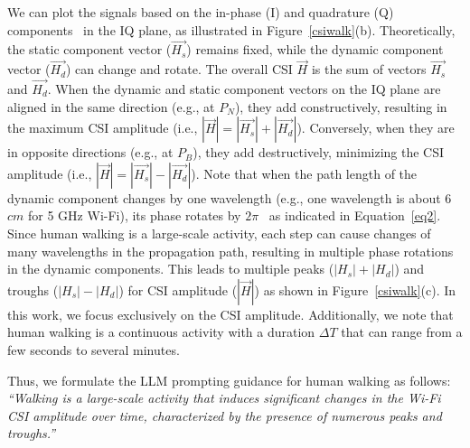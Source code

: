 


We can plot the signals based on the in-phase (I) and quadrature (Q) components~\cite{wang2015understanding} in the IQ plane, as illustrated in Figure~\ref{csiwalk}(b). Theoretically, the static component vector ($\vec{H_s}$) remains fixed, while the dynamic component vector ($\vec{H_d}$) can change and rotate. The overall CSI $\vec{H}$ is the sum of vectors $\vec{H_s}$ and $\vec{H_d}$. When the dynamic and static component vectors on the IQ plane are aligned in the same direction (e.g., at $P_{N}$), they add constructively, resulting in the maximum CSI amplitude (i.e., $|\vec{H}|=|\vec{H_s}|+|\vec{H_d}|$). Conversely, when they are in opposite directions (e.g., at $P_{B}$), they add destructively, minimizing the CSI amplitude (i.e., $|\vec{H}|=|\vec{H_s}|-|\vec{H_d}|$). Note that when the path length of the dynamic component changes by one wavelength (e.g., one wavelength is about 6 $cm$ for 5 GHz Wi-Fi), its phase rotates by $2\pi$~\cite{ren2021winect, ren2022gopose} as indicated in Equation~\ref{eq2}. Since human walking is a large-scale activity, each step can cause changes of many wavelengths in the propagation path, resulting in multiple phase rotations in the dynamic components. This leads to multiple peaks ($|H_s|+|H_d|$) and troughs ($|H_s|-|H_d|$) for CSI amplitude ($|\vec{H}|$) as shown in Figure~\ref{csiwalk}(c). In this work, we focus exclusively on the CSI amplitude. Additionally, we note that human walking is a continuous activity with a duration $\Delta T$ that can range from a few seconds to several minutes.

Thus, we formulate the LLM prompting guidance for human walking as follows: 
\emph{``Walking is a large-scale activity that induces significant changes in the Wi-Fi CSI amplitude over time, characterized by the presence of numerous peaks and troughs.''}



